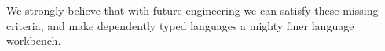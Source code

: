 We strongly believe that with future engineering we can satisfy these missing criteria,
and make dependently typed languages a mighty finer language workbench.


